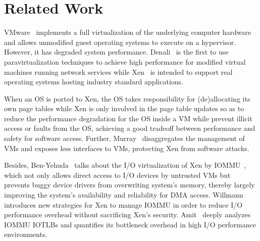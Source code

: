 \section{Related Work} \label{sec:rel}
VMware~\cite{devine2002virtualization} implements a full virtualization of the underlying computer hardware and allows unmodified guest operating systems to execute on a hypervisor. However, it has degraded system performance. Denali~\cite{whitaker2002scale} is the first to use paravirtualization techniques to achieve high performance for modified virtual machines running network services while Xen~\cite{barham2003xen} is intended to support real operating systems hosting industry standard applications.

When an OS is ported to Xen, the OS takes responsibility for (de)allocating its own page tables while Xen is only involved in the page table updates so as to reduce the performance degradation for the OS inside a VM while prevent illicit access or faults from the OS, achieving a good tradeoff between performance and safety for software access. Further, Murray~\cite{disaggregation} disaggregates the management of VMs and exposes less interfaces to VMs, protecting Xen from software attacks.

Besides, Ben-Yehuda~\cite{ben2008xen} talks about the I/O virtualization of Xen by IOMMU~\cite{intelvt,amdvt}, which not only allows direct access to I/O devices by untrusted VMs but prevents buggy device drivers from overwriting system's memory, thereby largely improving the system's availability and reliability for DMA access. Willmann~\cite{willmann2008protection} introduces new strategies for Xen to manage IOMMU in order to reduce I/O performance overhead without sacrificing Xen's security. Amit~\cite{amit2012iommu} deeply analyzes IOMMU IOTLBs and quantifies its bottleneck overhead in high I/O performance environments.   




